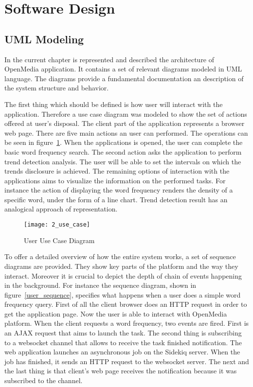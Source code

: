 \section{Software Design}
\subsection{UML Modeling}
In the current chapter is represented and described the architecture of OpenMedia application. It contains a set of relevant diagrams modeled in UML language. The diagrams provide a fundamental documentation an description of the system structure and behavior.

The first thing which should be defined is how user will interact with the application. Therefore a use case diagram was modeled to show the set of actions offered at user's disposal. The client part of the application represents a browser web page. There are five main actions an user can performed. The operations can be seen in \mbox{figure \ref{use_case}}. When the applications is opened, the user can complete the basic word frequency search. The second action asks the application to perform trend detection analysis. The user will be able to set the intervals on which the trends disclosure is achieved. The remaining options of interaction with the applications aims to visualize the information on the performed tasks. For instance the action of displaying the word frequency renders the density of a specific word, under the form of a line chart. Trend detection result has an analogical approach of representation.

\begin{figure}[!ht]
\centering
\texttt{[image: 2\_use\_case]}
\caption{User Use Case Diagram}\label{use_case}
\end{figure}

To offer a detailed overview of how the entire system works, a set of sequence diagrams are provided. They show key parts of the platform and the way they interact. Moreover it is crucial to depict the depth of chain of events happening in the background. For instance the sequence diagram, shown in \mbox{figure \ref{user_sequence}}, specifies what happens when a user does a simple word frequency query. First of all the client browser does an HTTP request in order to get the application page. Now the user is able to interact with OpenMedia platform. When the client requests a word frequency, two events are fired. First is an AJAX request that aims to launch the task. The second thing is subscribing to a websocket channel that allows to receive the task finished notification. The web application launches an asynchronous job on the Sidekiq server. When the job has finished, it sends an HTTP request to the websocket server. The next and the last thing is that client's web page receives the notification because it was subscribed to the channel.

